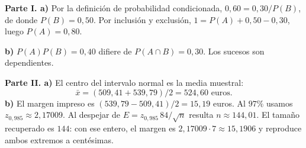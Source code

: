 \textbf{Parte I. a)} Por la definición de probabilidad condicionada, $0{,}60=0{,}30/P(B)$, de donde $P(B)=\boxed{0{,}50}$. Por inclusión y exclusión, $1=P(A)+0{,}50-0{,}30$, luego $P(A)=\boxed{0{,}80}$.

\textbf{b)} $P(A)P(B)=0{,}40$ difiere de $P(A\cap B)=0{,}30$. Los sucesos son dependientes.

\textbf{Parte II. a)} El centro del intervalo normal es la media muestral:
\[
\bar x=(509{,}41+539{,}79)/2=\boxed{524{,}60\text{ euros}}.
\]
\textbf{b)} El margen impreso es $(539{,}79-509{,}41)/2=15{,}19$ euros. Al $97\%$ usamos $z_{0{,}985}\approx2{,}17009$. Al despejar de $E=z_{0{,}985}\,84/\sqrt n$ resulta $n\approx144{,}01$. El tamaño recuperado es $\boxed{144}$: con ese entero, el margen es $2{,}17009\cdot7\approx15{,}1906$ y reproduce ambos extremos a centésimas.
